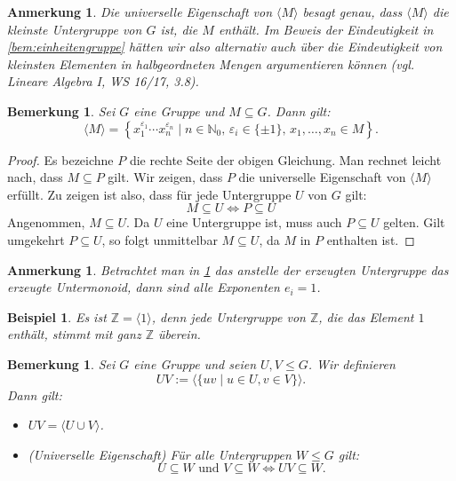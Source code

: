 \documentclass[a4paper, twoside, 11pt, ngerman]{report}
\newcommand{\NN}{\mathds N}
\newcommand{\ZZ}{\mathds Z}
\theoremstyle{definistyle}
\newtheorem{bem}[satz]{Bemerkung}
\newtheorem{anm}[satz]{Anmerkung}
\newtheorem{bsp}[satz]{Beispiel}
\theoremstyle{remark}
\begin{document}
\begin{anm}\label{anm:kleinste_untergruppe}
Die universelle Eigenschaft von $\langle M \rangle$ besagt genau, dass $\langle M \rangle$ die kleinste Untergruppe von $G$ ist, die $M$ enthält. Im Beweis der Eindeutigkeit in \ref{bem:einheitengruppe} hätten wir also alternativ auch über die Eindeutigkeit von kleinsten Elementen in halbgeordneten Mengen argumentieren können (vgl. Lineare Algebra I, WS 16/17, 3.8).
\end{anm}

\begin{bem}\label{bem:erzeugnisse}
Sei $G$ eine Gruppe und $M \subseteq G$. Dann gilt:
\[
\langle M \rangle = \left\{ x_1^{\varepsilon_1} \cdots x_n^{\varepsilon_n} \mid n \in \NN_0, \, \varepsilon_i \in \{\pm 1\}, \, x_1, \dots, x_n \in M \right\}.
\]
\end{bem}

\begin{proof}
Es bezeichne $P$ die rechte Seite der obigen Gleichung. Man rechnet leicht nach, dass $M \subseteq P$ gilt. Wir zeigen, dass $P$ die universelle Eigenschaft von $\langle M\rangle$ erfüllt. Zu zeigen ist also, dass für jede Untergruppe $U$ von $G$ gilt:
\[
M \subseteq U \iff P \subseteq U
\]
Angenommen, $M \subseteq U$. Da $U$ eine Untergruppe ist, muss auch $P \subseteq U$ gelten.
Gilt umgekehrt $P \subseteq U$, so folgt unmittelbar $M \subseteq U$, da $M$ in $P$ enthalten ist.
\end{proof}


\begin{anm}\label{anm:erzeugte_untergruppe_mit_eins}
Betrachtet man in \ref{bem:erzeugnisse} das anstelle der erzeugten Untergruppe das erzeugte Untermonoid, dann sind alle Exponenten $e_i = 1$.
\end{anm}

\begin{bsp}\label{bsp:erzeugte_untergruppe_Z}
Es ist $\ZZ = \langle 1 \rangle$, denn jede Untergruppe von $\mathbb{Z}$, die das Element $1$ enthält, stimmt mit ganz $\ZZ$
überein.
\end{bsp}

\begin{bem}\label{bem:vereinigung_untergruppen}
Sei $G$ eine Gruppe und seien $U, V \leq G$. Wir definieren
\[
UV := \langle \{ uv \mid u \in U, v \in V \} \rangle.
\]
Dann gilt:
\begin{itemize}
    \item[(a)] $UV = \langle U \cup V \rangle$.
    \item[(b)] (Universelle Eigenschaft) Für alle Untergruppen $W \leq G$ gilt:
    \[
    U \subseteq W \text{ und } V \subseteq W \Leftrightarrow UV \subseteq W.
    \]
\end{itemize}
\end{bem}
\end{document}
